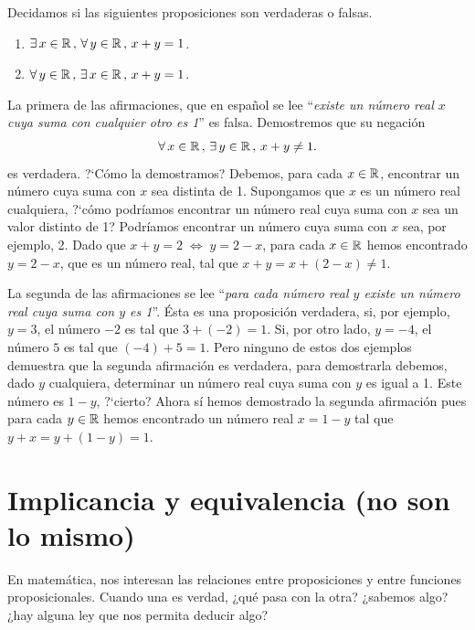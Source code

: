 \begin{ejemplo}
	Decidamos si las siguientes proposiciones son verdaderas o falsas.
	\begin{enumerate}
		\item $\exists\,x\in \mathbb{R}\, ,\,\forall\, y \in \mathbb{R}\, ,\, x+y=1$.
		\item $\forall\,y\in \mathbb{R}\, ,\,\exists\, x \in \mathbb{R}\, ,\, x+y=1$.
	\end{enumerate}

	La primera de las afirmaciones, que en espa\~nol se lee 
	``{\em existe un n\'umero real $x$ cuya suma con cualquier otro es 1}''
	es falsa. Demostremos que su negaci\'on
	\[
		\forall\,x\in \mathbb{R}\, ,\,\exists\,y\in \mathbb{R}\, ,\,x+y\ne 1.
	\]
	es verdadera. ?`C\'omo la demostramos? Debemos, para cada $x \in \mathbb{R}$,
	encontrar un n\'umero cuya suma con $x$ sea distinta de 1.
	Supongamos que $x$ es un n\'umero real cualquiera, ?`c\'omo podr\'iamos
	encontrar un n\'umero real 
	cuya suma con $x$ sea un valor distinto de 1? Podríamos encontrar
	un n\'umero cuya suma con $x$ sea, por ejemplo, 2. 
	Dado que $x+y = 2 \;\Leftrightarrow\; y = 2-x$,
	para cada $x\in \mathbb{R}$ hemos encontrado $y = 2-x$, que es un n\'umero
	real, tal que $x + y = x + (2-x) \ne 1$. 
	
	La segunda de las afirmaciones se lee ``{\em para
	cada n\'umero real $y$ existe un n\'umero real cuya suma con $y$ es 1}''.
	\'Esta es una proposici\'on verdadera, si, por ejemplo, $y=3$, 
	el n\'umero $-2$ es tal que $3+(-2)=1$. Si, por otro lado, $y=-4$,
	el n\'umero $5$ es tal que $(-4)+5=1$. Pero ninguno de estos dos
	ejemplos demuestra que la segunda afirmaci\'on es verdadera, para
	demostrarla debemos, dado $y$ cualquiera, determinar un n\'umero
	real cuya suma con $y$ es igual a 1.
	Este n\'umero es $1-y$, ?`cierto? Ahora s\'i hemos demostrado
	la segunda afirmaci\'on pues para cada $y\in \mathbb{R}$ hemos
	encontrado un n\'umero real $x=1-y$ tal que $y + x = y + (1-y) = 1$.
\end{ejemplo}



\section{Implicancia y equivalencia (no son lo mismo)} 

\medskip 
En matemática, nos interesan las relaciones entre proposiciones y entre funciones proposicionales.
Cuando una es verdad, ¿qué pasa con la otra? ¿sabemos algo? ¿hay alguna ley que nos permita deducir algo?

